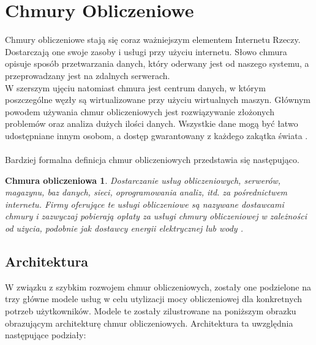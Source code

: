 \documentclass[12pt]{report}
\let\Oldsection\section
\renewcommand{\section}{\FloatBarrier\Oldsection}
\let\Oldsubsection\subsection
\renewcommand{\subsection}{\FloatBarrier\Oldsubsection}
\newtheorem{cloudcomputing}{Chmura obliczeniowa}
\begin{document}
\section{Chmury Obliczeniowe}
Chmury obliczeniowe stają się coraz ważniejszym elementem Internetu Rzeczy. Dostarczają one swoje zasoby i usługi przy użyciu internetu. Słowo chmura opisuje sposób przetwarzania danych, który oderwany jest od naszego systemu, a przeprowadzany jest na zdalnych serwerach. \\
\indent W szerszym ujęciu natomiast chmura jest centrum danych, w którym poszczególne węzły są wirtualizowane przy użyciu wirtualnych maszyn. Głównym powodem używania chmur obliczeniowych jest rozwiązywanie złożonych problemów oraz analiza dużych ilości danych. Wszystkie dane mogą być łatwo udostępniane innym osobom, a dostęp gwarantowany z każdego zakątka świata \cite{cloud}. \\ \\
Bardziej formalna definicja chmur obliczeniowych przedstawia się następująco.
\begin{cloudcomputing}
Dostarczanie usług obliczeniowych, serwerów, magazynu, baz danych, sieci, oprogramowania analiz, itd. za pośrednictwem internetu. Firmy oferujące te usługi obliczeniowe są nazywane dostawcami chmury i zazwyczaj pobie\-rają opłaty za usługi chmury obliczeniowej w zależności od użycia, podobnie jak dostawcy energii elektrycznej lub wody \cite{cloudComputing}.
\end{cloudcomputing}

\subsection{Architektura}
W związku z szybkim rozwojem chmur obliczeniowych, zostały one podzielone na trzy główne modele usług w celu utylizacji mocy obliczeniowej dla konkretnych potrzeb użytkowników. Modele te zostały zilustrowane na poniższym obrazku obrazującym architekturę chmur obliczeniowych. Architektura ta uwzględnia następujące podziały:
\end{document}
